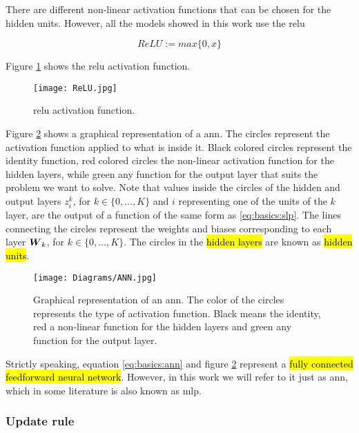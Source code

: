 There are different non-linear activation functions that can be chosen for the hidden units. However, all the models showed in this work use the \gls{relu}

\begin{equation}
  ReLU := max\{0, x\}
\end{equation}

Figure \ref{fig:basics:ann:relu} shows the \gls{relu} activation function.

\begin{figure}[!ht]
  \centering
  \texttt{[image: ReLU.jpg]}
  \caption{\gls{relu} activation function.}
  \label{fig:basics:ann:relu}
\end{figure}

Figure \ref{fig:basics:ann:ann} shows a graphical representation of a \gls{ann}. The circles represent the activation function applied to what is inside it. Black colored circles represent the identity function, red colored circles the non-linear activation function for the hidden layers, while green any function for the output layer that suits the problem we want to solve. Note that values inside the circles of the hidden and output layers $z^k_i$, for $k\in\{0, \dots, K\}$ and $i$ representing one of the units of the $k$ layer, are the output of a function of the same form as \ref{eq:basics:slp}. The lines connecting the circles represent the weights and biases corresponding to each layer $\boldsymbol{W}_k$, for $k\in\{0, \dots, K\}$. The circles in the \hl{hidden layers} are known as \hl{hidden units}.

\begin{figure}[!ht]
  \centering
  \texttt{[image: Diagrams/ANN.jpg]}
  \caption{Graphical representation of an \gls{ann}. The color of the circles represents the type of activation function. Black means the identity, red a non-linear function for the hidden layers and green any function for the output layer.}
  \label{fig:basics:ann:ann}
\end{figure}

Strictly speaking, equation \ref{eq:basics:ann} and figure \ref{fig:basics:ann:ann} represent a \hl{fully connected feedforward neural network}. However, in this work we will refer to it just as \gls{ann}, which in some literature is also known as \gls{mlp}.

\subsubsection{Update rule}

